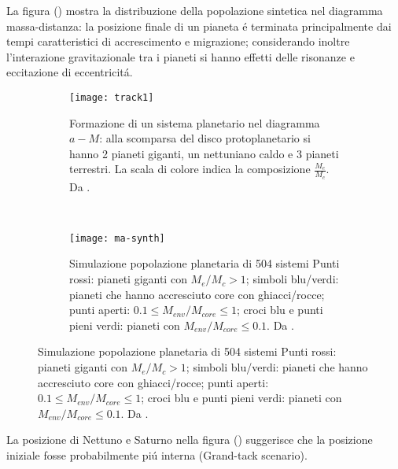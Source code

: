 La figura () mostra la distribuzione della popolazione sintetica nel diagramma massa-distanza: la posizione finale di un pianeta \'e terminata principalmente dai tempi caratteristici di accrescimento e migrazione; considerando inoltre l'interazione gravitazionale tra i pianeti si hanno effetti delle risonanze e eccitazione di eccentricit\'a.

\begin{figure}[!ht]
\begin{subfigure}[b]{0.5\textwidth}
\centering
\texttt{[image: track1]}
\caption{Formazione di un sistema planetario nel diagramma $a-M$: alla scomparsa del disco protoplanetario si hanno 2 pianeti giganti, un nettuniano caldo e 3 pianeti terrestri. La scala di colore indica la composizione $\frac{M_e}{M_c}$. Da \cite{mordasini2018planetary}.}\label{fig:track1}
\end{subfigure}
~
\begin{subfigure}[b]{0.5\textwidth}
\texttt{[image: ma-synth]}
\caption{Simulazione popolazione planetaria di 504 sistemi Punti rossi: pianeti giganti con $M_e/M_c>1$; simboli blu/verdi: pianeti che hanno accresciuto core con ghiacci/rocce; punti aperti: $0.1\leq M_{env}/M_{core}\leq1$; croci blu e punti pieni verdi: pianeti con $M_{env}/M_{core}\leq0.1$. Da \cite{mordasini2018planetary}.}\label{fig:ma-synth}
\end{subfigure}
\end{figure}
La posizione di Nettuno e Saturno nella figura () suggerisce che la posizione iniziale fosse probabilmente pi\'u interna (Grand-tack scenario).


